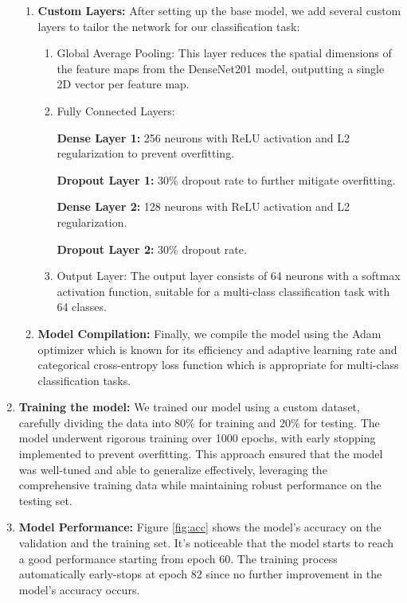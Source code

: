 \begin{enumerate}
\begin{enumerate}
        \item \textbf{Custom Layers:}  After setting up the base model, we add several custom layers to tailor the network for our classification task:

        \begin{enumerate}
            \item Global Average Pooling: This layer reduces the spatial dimensions of the feature maps from the DenseNet201 model, outputting a single 2D vector per feature map.
            \item Fully Connected Layers: 

            \textbf{Dense Layer 1:} 256 neurons with ReLU activation and L2 regularization to prevent overfitting.
            
            \textbf{Dropout Layer 1:} 30\% dropout rate to further mitigate overfitting.
            
            \textbf{Dense Layer 2:} 128 neurons with ReLU activation and L2 regularization.
            
           \textbf{Dropout Layer 2:} 30\% dropout rate.

            \item Output Layer: The output layer consists of 64 neurons with a softmax activation function, suitable for a multi-class classification task with 64 classes.
        \end{enumerate}

        \item \textbf{Model Compilation:} Finally, we compile the model using the Adam optimizer which is known for its efficiency and adaptive learning rate and categorical cross-entropy loss function which is  appropriate for multi-class classification tasks.
        
  \end{enumerate}  
  \item \textbf{Training the model:}
  We trained our model using a custom dataset, carefully dividing the data into 80\% for training and 20\% for testing. The model underwent rigorous training over 1000 epochs, with early stopping implemented to prevent overfitting. This approach ensured that the model was well-tuned and able to generalize effectively, leveraging the comprehensive training data while maintaining robust performance on the testing set.

   \item \textbf{Model Performance:}
   Figure \ref{fig:acc} shows the model's accuracy on the validation and the training set. It's noticeable that the model starts to reach a good performance starting from epoch 60. The training process automatically early-stops at epoch 82 since no further improvement in the model's accuracy occurs.


\end{enumerate}

